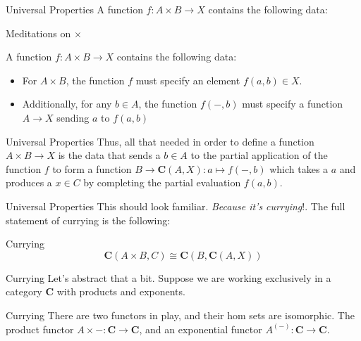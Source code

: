 \documentclass[tikz]{beamer}
\theoremstyle{definition}
\newcommand{\cat}[1]{\mathbf{#1}}
\begin{document}
\begin{frame}{Universal Properties}
    A function $f: A \times B \to X$ contains the following data:
\end{frame}{}

\begin{frame}{Meditations on $\times$}

    A function $f: A \times B \to X$ contains the following data:
    \begin{block}{}

        \begin{itemize}
            \item For $A \times B$, the function $f$ must specify an element $f(a,b) \in X$.

            \item Additionally, for any $b \in A$, the function $f(-,b)$ must specify a function $A \to X$ sending $a$ to $f(a,b)$
        \end{itemize}{}
    \end{block}{}
\end{frame}{}

\begin{frame}{Universal Properties}
    Thus, all that needed in order to define a function $A \times B \to X$ is the data that sends a $b \in A$ to the partial application of the function $f$ to form a function $B \to \mathbf{C}(A, X): a \mapsto f(-,b)$ which takes a $a$ and produces a $x \in C$ by completing the partial evaluation $f(a,b)$.
\end{frame}{}

\begin{frame}{Universal Properties}
    This should look familiar. \textit{Because it's currying}!. The full statement of currying is the following:

\begin{block}{Currying}
\begin{equation*}
    \mathbf{C}(A \times B, C) \cong \mathbf{C}(B, \mathbf{C}(A, X))
\end{equation*}{}
\end{block}{}
\end{frame}

\begin{frame}{Currying}
    Let's abstract that a bit. Suppose we are working exclusively in a category $\cat{C}$ with products and exponents.
\end{frame}

\begin{frame}{Currying}
   There are two functors in play, and their hom sets are isomorphic. The product functor $A \times - : \cat{C} \to \cat{C}$, and an exponential functor $A^{(-)}: \cat{C} \to \cat{C}$.
\end{frame}
\end{document}
